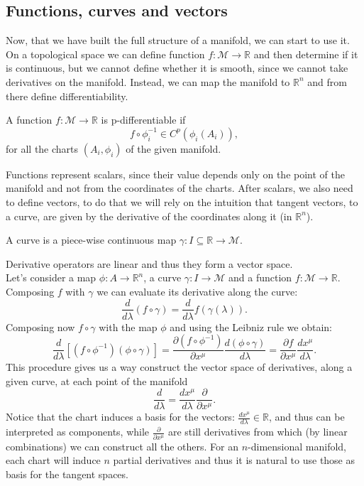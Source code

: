 \subsection{Functions, curves and vectors}
Now, that we have built the full structure of a manifold, we can start to use it. On a topological space we can define function $f:\mathcal{M} \rightarrow\mathbb{R}$ and then determine if it is continuous, but we cannot define whether it is smooth, since we cannot take derivatives on the manifold. Instead, we can map the manifold to $\mathbb{R} ^n$ and from there define differentiability. 
\begin{defin}
	A function $f:\mathcal{M} \rightarrow \mathbb{R} $ is p-differentiable if $$ f\circ\phi_i^{-1}\in C^p(\phi_i(A_i)),$$ for all the charts $(A_i,\phi_i)$ of the given manifold.
\end{defin} 
Functions represent scalars, since their value depends only on the point of the manifold and not from the coordinates of the charts. After scalars, we also need to define vectors, to do that we will rely on the intuition that tangent vectors, to a curve, are given by the derivative of the coordinates along it (in $\mathbb{R} ^n$).
\begin{defin}[Curves]
	A curve is a piece-wise continuous map $\gamma:I\subseteq\mathbb{R} \rightarrow\mathcal{M}$.
\end{defin}
\begin{obs}
   Derivative operators are linear and thus they form a vector space.\\ Let's consider a map $\phi:A\rightarrow\mathbb{R}^n$, a curve  $\gamma:I \rightarrow\mathcal{M}$ and a function $f:\mathcal{M} \rightarrow\mathbb{R}$. Composing $f$ with $\gamma$ we can evaluate its derivative along the curve:$$\frac{d}{d\lambda}(f\circ\gamma)=\frac{d}{d\lambda}f(\gamma(\lambda)).$$
   Composing now $f\circ\gamma$ with the map $\phi$ and using the Leibniz rule we obtain:
   $$\frac{d}{d\lambda}[(f\circ\phi^{-1})(\phi\circ\gamma)]=\frac{\partial(f\circ\phi^{-1})}{\partial x^\mu}\frac{d(\phi\circ\gamma)}{d\lambda}=\frac{\partial f}{\partial x^\mu}\frac{dx^\mu}{d\lambda}.$$
   This procedure gives us a way construct the vector space of derivatives, along a given curve, at each point of the manifold $$\frac{d}{d\lambda}=\frac{dx^\mu}{d\lambda}\frac{\partial}{\partial x^\mu}.$$
   Notice that the chart induces a basis for the vectors: $\frac{dx^\mu}{d\lambda}\in\mathbb{R} $, and thus can be interpreted as components, while $\frac{\partial}{\partial x^\mu}$ are still derivatives from which (by linear combinations) we can construct all the others. For an $n$-dimensional manifold, each chart will induce $n$ partial derivatives and thus it is natural to use those as basis for the tangent spaces.
\end{obs}
